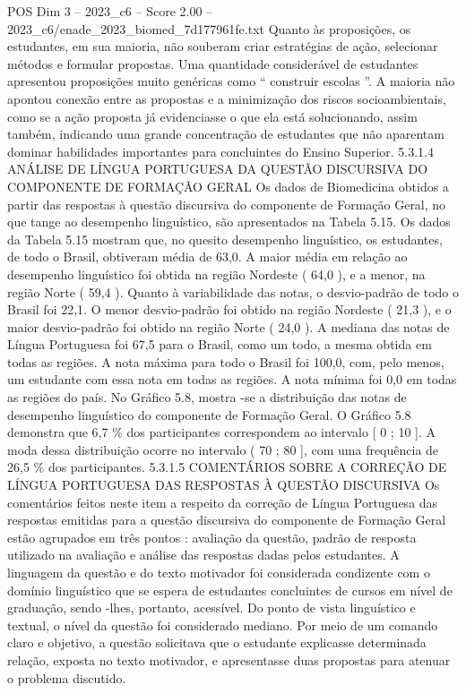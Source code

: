 \begin{textsample}{POS Dim 3 – 2023\_c6 – Score 2.00 – 2023\_c6/enade\_2023\_biomed\_7d177961fe.txt}
Quanto às proposições, os estudantes, em sua maioria, não souberam criar estratégias de ação, selecionar métodos e formular propostas.
Uma quantidade considerável de estudantes apresentou proposições muito genéricas como “ construir escolas ”.
A maioria não apontou conexão entre as propostas e a minimização dos riscos socioambientais, como se a ação proposta já evidenciasse o que ela está solucionando, assim também, indicando uma grande concentração de estudantes que não aparentam dominar habilidades importantes para concluintes do Ensino Superior. 5.3.1.4 ANÁLISE DE LÍNGUA PORTUGUESA DA QUESTÃO DISCURSIVA DO COMPONENTE DE FORMAÇÃO GERAL Os dados de Biomedicina obtidos a partir das respostas à questão discursiva do componente de Formação Geral, no que tange ao desempenho linguístico, são apresentados na Tabela 5.15.
Os dados da Tabela 5.15 mostram que, no quesito desempenho linguístico, os estudantes, de todo o Brasil, obtiveram média de 63,0.
A maior média em relação ao desempenho linguístico foi obtida na região Nordeste ( 64,0 ), e a menor, na região Norte ( 59,4 ).
Quanto à variabilidade das notas, o desvio-padrão de todo o Brasil foi 22,1.
O menor desvio-padrão foi obtido na região Nordeste ( 21,3 ), e o maior desvio-padrão foi obtido na região Norte ( 24,0 ).
A mediana das notas de Língua Portuguesa foi 67,5 para o Brasil, como um todo, a mesma obtida em todas as regiões.
A nota máxima para todo o Brasil foi 100,0, com, pelo menos, um estudante com essa nota em todas as regiões.
A nota mínima foi 0,0 em todas as regiões do país.
No Gráfico 5.8, mostra -se a distribuição das notas de desempenho linguístico do componente de Formação Geral.
O Gráfico 5.8 demonstra que 6,7 \% dos participantes correspondem ao intervalo [ 0 ; 10 ].
A moda dessa distribuição ocorre no intervalo ( 70 ; 80 ], com uma frequência de 26,5 \% dos participantes. 5.3.1.5 COMENTÁRIOS SOBRE A CORREÇÃO DE LÍNGUA PORTUGUESA DAS RESPOSTAS À QUESTÃO DISCURSIVA Os comentários feitos neste item a respeito da correção de Língua Portuguesa das respostas emitidas para a questão discursiva do componente de Formação Geral estão agrupados em três pontos : avaliação da questão, padrão de resposta utilizado na avaliação e análise das respostas dadas pelos estudantes.
A linguagem da questão e do texto motivador foi considerada condizente com o domínio linguístico que se espera de estudantes concluintes de cursos em nível de graduação, sendo -lhes, portanto, acessível.
Do ponto de vista linguístico e textual, o nível da questão foi considerado mediano.
Por meio de um comando claro e objetivo, a questão solicitava que o estudante explicasse determinada relação, exposta no texto motivador, e apresentasse duas propostas para atenuar o problema discutido.

\end{textsample}
